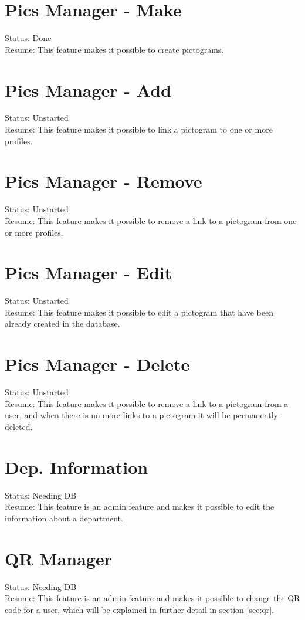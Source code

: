 \section{Pics Manager - Make}
Status: Done\\
Resume: This feature makes it possible to create pictograms.

\section{Pics Manager - Add}
Status: Unstarted\\
Resume: This feature makes it possible to link a pictogram to one or more profiles.

\section{Pics Manager - Remove}
Status: Unstarted\\
Resume: This feature makes it possible to remove a link to a pictogram from one or more profiles.

\section{Pics Manager - Edit}
Status: Unstarted\\
Resume: This feature makes it possible to edit a pictogram that have been already created in the database.

\section{Pics Manager - Delete}
Status: Unstarted\\
Resume: This feature makes it possible to remove a link to a pictogram from a user, and when there is no more links to a pictogram it will be permanently deleted. 

\section{Dep. Information}
Status: Needing DB\\
Resume: This feature is an admin feature and makes it possible to edit the information about a department.

\section{QR Manager}
Status: Needing DB\\
Resume: This feature is an admin feature and makes it possible to change the QR code for a user, which will be explained in further detail in section \vref{sec:qr}.

